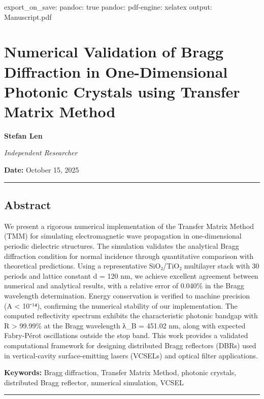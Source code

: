 \documentclass[
]{article}
\author{}
\date{}
\begin{document}
export\_on\_save: pandoc: true pandoc: pdf-engine: xelatex output:
Manuscript.pdf

\section{Numerical Validation of Bragg Diffraction in One-Dimensional
Photonic Crystals using Transfer Matrix
Method}\label{numerical-validation-of-bragg-diffraction-in-one-dimensional-photonic-crystals-using-transfer-matrix-method}

\textbf{Stefan Len}

\emph{Independent Researcher}

\textbf{Date:} October 15, 2025

\begin{center}\rule{0.5\linewidth}{0.5pt}\end{center}

\subsection{Abstract}\label{abstract}

We present a rigorous numerical implementation of the Transfer Matrix
Method (TMM) for simulating electromagnetic wave propagation in
one-dimensional periodic dielectric structures. The simulation validates
the analytical Bragg diffraction condition for normal incidence through
quantitative comparison with theoretical predictions. Using a
representative SiO₂/TiO₂ multilayer stack with 30 periods and lattice
constant d = 120 nm, we achieve excellent agreement between numerical
and analytical results, with a relative error of 0.040\% in the Bragg
wavelength determination. Energy conservation is verified to machine
precision (\textbar A\textbar{} \textless{} 10⁻¹⁴), confirming the
numerical stability of our implementation. The computed reflectivity
spectrum exhibits the characteristic photonic bandgap with R
\textgreater{} 99.99\% at the Bragg wavelength λ\_B = 451.02 nm, along
with expected Fabry-Pérot oscillations outside the stop band. This work
provides a validated computational framework for designing distributed
Bragg reflectors (DBRs) used in vertical-cavity surface-emitting lasers
(VCSELs) and optical filter applications.

\textbf{Keywords:} Bragg diffraction, Transfer Matrix Method, photonic
crystals, distributed Bragg reflector, numerical simulation, VCSEL

\begin{center}\rule{0.5\linewidth}{0.5pt}\end{center}
\end{document}
